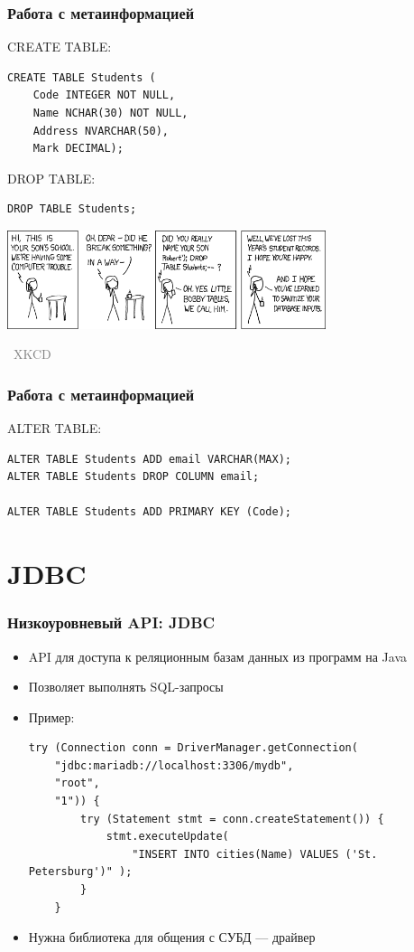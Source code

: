 \documentclass[xetex,mathserif,serif]{beamer}
\newcommand{\attribution}[1] {
\vspace{-5mm}\begin{flushright}\begin{scriptsize}\textcolor{gray}{\textcopyright\, #1}\end{scriptsize}\end{flushright}
}
\begin{document}
	\begin{frame}[fragile]
		\frametitle{Работа с метаинформацией}
		\begin{small}
			CREATE TABLE:
			\begin{verbatim}
CREATE TABLE Students (
    Code INTEGER NOT NULL,
    Name NCHAR(30) NOT NULL,
    Address NVARCHAR(50),
    Mark DECIMAL);
			\end{verbatim}

			\vspace{3mm}
			DROP TABLE:
			\begin{verbatim}
DROP TABLE Students;
			\end{verbatim}
		\end{small}

		\begin{center}
			\includegraphics[width=0.7\textwidth]{bobbyTables.png}
			\attribution{XKCD}
		\end{center}
	\end{frame}

	\begin{frame}[fragile]
		\frametitle{Работа с метаинформацией}
		ALTER TABLE:
		\begin{verbatim}
ALTER TABLE Students ADD email VARCHAR(MAX);
ALTER TABLE Students DROP COLUMN email;

ALTER TABLE Students ADD PRIMARY KEY (Code);

		\end{verbatim}
	\end{frame}

	\section{JDBC}

	\begin{frame}[fragile]
		\frametitle{Низкоуровневый API: JDBC}
		\begin{itemize}
			\item API для доступа к реляционным базам данных из программ на Java
			\item Позволяет выполнять SQL-запросы
			\item Пример:
			\begin{footnotesize}
				\begin{verbatim}
try (Connection conn = DriverManager.getConnection(
    "jdbc:mariadb://localhost:3306/mydb",
    "root",
    "1")) {
        try (Statement stmt = conn.createStatement()) {
            stmt.executeUpdate(
                "INSERT INTO cities(Name) VALUES ('St. Petersburg')" );
        }
    }
				\end{verbatim}
			\end{footnotesize}
			\item Нужна библиотека для общения с СУБД --- драйвер
		\end{itemize}
	\end{frame}
\end{document}
